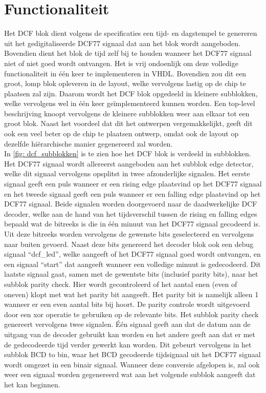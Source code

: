 \documentclass[a4paper, twoside, 10pt]{article}
\begin{document}
\section{Functionaliteit}
Het DCF blok dient volgens de specificaties een tijd- en dagstempel te genereren uit het gedigitaliseerde DCF77 signaal dat aan het blok wordt aangeboden. Bovendien dient het blok de tijd zelf bij te houden wanneer het DCF77 signaal niet of niet goed wordt ontvangen. Het is vrij ondoenlijk om deze volledige functionaliteit in \'e\'en keer te implementeren in VHDL. Bovendien zou dit een groot, lomp blok opleveren in de layout, welke vervolgens lastig op de chip te plaatsen zal zijn. Daarom wordt het DCF blok opgedeeld in kleinere subblokken, welke vervolgens wel in \'e\'en keer geïmplementeerd kunnen worden. Een top-level beschrijving knoopt vervolgens de kleinere subblokken weer aan elkaar tot een groot blok. Naast het voordeel dat dit het ontwerpen vergemakkelijkt, geeft dit ook een veel beter op de chip te plaatsen ontwerp, omdat ook de layout op dezelfde hi\"erarchische manier gegenereerd zal worden.\\

\noindent In \cref{fig: dcf_subblokken} is te zien hoe het DCF blok is verdeeld in subblokken. Het DCF77 signaal wordt allereerst aangeboden aan het subblok edge detector, welke dit signaal vervolgens opsplitst in twee afzonderlijke signalen. Het eerste signaal geeft een puls wanneer er een rising edge plaatsvind op het DCF77 signaal en het tweede signaal geeft een puls wanneer er een falling edge plaatsvind op het DCF77 signaal. Beide signalen worden doorgevoerd naar de daadwerkelijke DCF decoder, welke aan de hand van het tijdsverschil tussen de rising en falling edges bepaald wat de bitreeks is die in \'e\'en minuut van het DCF77 signaal gecodeerd is. Uit deze bitreeks worden vervolgens de gewenste bits geselecteerd en vervolgens naar buiten gevoerd. Naast deze bits genereerd het decoder blok ook een debug signaal ``dcf\_led'', welke aangeeft of het DCF77 signaal goed wordt ontvangen, en een signaal ``start'' dat aangeeft wanneer een volledige minuut is gedecodeerd. Dit laatste signaal gaat, samen met de gewentste bits (inclusief parity bits), naar het subblok parity check. Hier wordt gecontroleerd of het aantal enen (even of oneven) klopt met wat het parity bit aangeeft. Het parity bit is namelijk alleen 1 wanneer er een even aantal bits bij hoort. De parity controle wordt uitgevoerd door een xor operatie te gebruiken op de relevante bits. Het subblok parity check genereert vervolgens twee signalen. \'E\'en signaal geeft aan dat de datum aan de uitgang van de decoder gebruikt kan worden en het andere geeft aan dat er met de gedecodeerde tijd verder gewerkt kan worden. Dit gebeurt vervolgens in het subblok BCD to bin, waar het BCD gecodeerde tijdsignaal uit het DCF77 signaal wordt omgezet in een binair signaal. Wanneer deze conversie afgelopen is, zal ook weer een signaal worden gegenereerd wat aan het volgende subblok aangeeft dat het kan beginnen.\\
\end{document}
